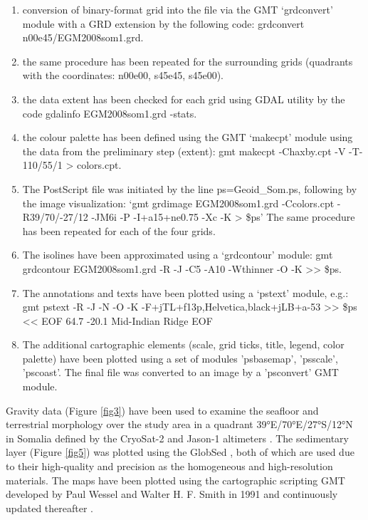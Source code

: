 \documentclass[]{interact}
\begin{document}
    \begin{enumerate}
      \item conversion of binary-format grid into the file via the GMT ‘grdconvert’ module with a GRD extension by the following code: grdconvert n00e45/EGM2008som1.grd.
      \item the same procedure has been repeated for the surrounding grids (quadrants with the coordinates: n00e00, s45e45, s45e00).
      \item the data extent has been checked for each grid using GDAL utility by the code gdalinfo EGM2008som1.grd -stats.
      \item the colour palette has been defined using the GMT ‘makecpt’ module using the data from the preliminary step (extent): gmt makecpt -Chaxby.cpt -V -T-110/55/1 > colors.cpt.
      \item The PostScript file was initiated by the line ps=Geoid\_Som.ps, following by the image visualization:  ‘gmt grdimage EGM2008som1.grd -Ccolors.cpt -R39/70/-27/12 -JM6i -P -I+a15+ne0.75 -Xc -K > \$ps’ The same procedure has been repeated for each of the four grids. 
      \item The isolines have been approximated using a ‘grdcontour’ module: gmt grdcontour EGM2008som1.grd -R -J -C5 -A10 -Wthinner -O -K >> \$ps.
      \item The annotations and texts have been plotted using a ‘pstext’ module, e.g.: gmt pstext -R -J -N -O -K -F+jTL+f13p,Helvetica,black+jLB+a-53 >> \$ps << EOF 64.7 -20.1 Mid-Indian Ridge EOF
      \item The additional cartographic elements (scale, grid ticks, title, legend, color palette) have been plotted using a set of modules 'psbasemap', 'psscale', 'pscoast'. The final file was converted to an image by a 'psconvert' GMT module.
    \end{enumerate}

Gravity data (Figure \ref{fig3}) have been used to examine the seafloor and terrestrial morphology over the study area in a quadrant 39°E/70°E/27°S/12°N in Somalia defined by the CryoSat-2 and Jason-1 altimeters \cite{Sandwelletal2014}. 
The sedimentary layer (Figure \ref{fig5}) was plotted using the GlobSed \cite{Straume}, both of which are used due to their high-quality and precision as the homogeneous and high-resolution materials. The maps have been plotted using the cartographic scripting GMT developed by Paul Wessel and Walter H. F. Smith in 1991 and continuously updated thereafter \cite{WesselSmith1991,Wesseletal2013}. 
\end{document}
